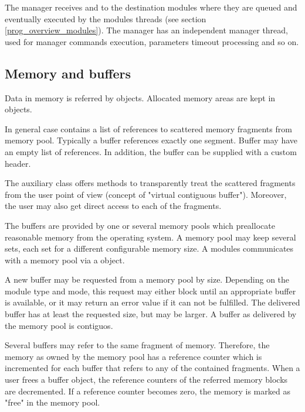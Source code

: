 The manager receives and  
to the destination modules where they are queued and eventually executed 
by the modules threads (see section \ref{prog_overview_modules}).
The manager has an independent manager thread, used for 
manager commands execution, parameters timeout processing and so on. 
 
 
\subsection{Memory and buffers}
Data in memory is referred by   objects. 
Allocated memory areas are kept in\\
objects. 
   

In general case  contains a list of references to scattered memory 
fragments from memory pool. Typically a buffer references exactly one segment.
Buffer may have an empty list of references. In addition, the buffer can be supplied
with a custom header.
 
The auxiliary class   
offers methods to transparently 
treat the scattered fragments from the user point of view 
(concept of "virtual contiguous buffer"). 
Moreover, the user may also get direct access to each of the fragments.      

The buffers are provided by one or several memory pools 
which preallocate reasonable memory from the operating system. 
A memory pool may keep several sets, each set for a different 
configurable memory size. A modules communicates with a memory pool 
via a   object. 

A new buffer may be requested from a memory pool by size. 
Depending on the module type and mode, this request may either block until an 
appropriate buffer is available, or it may return an error value 
if it can not be fulfilled. The delivered buffer has at 
least the requested size, but may be larger. A buffer as 
delivered by the memory pool is contiguos. 

Several buffers may refer to the same fragment of memory. 
Therefore, the memory as owned by the memory pool has a 
reference counter which is incremented for each buffer 
that refers to any of the contained fragments. When a user frees 
a buffer object, the reference counters of the referred 
memory blocks are decremented. If a reference counter becomes 
zero, the memory is marked as "free" in the memory pool.

